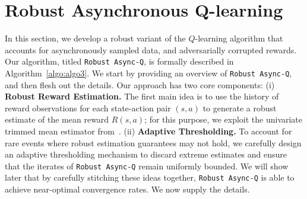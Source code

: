 \documentclass{article}
\begin{document}
\section{Robust Asynchronous Q-learning}
\label{sec:robustQ}
In this section, we develop a robust variant of the \(Q\)-learning algorithm that accounts for asynchronously sampled data, and adversarially corrupted rewards. Our algorithm, titled \textcolor{winered}{\texttt{Robust Async-Q}}, is formally described in Algorithm~\ref{algo:algo3}. We start by providing an overview of \texttt{Robust Async-Q}, and then flesh out the details. Our approach has two core components: (i) \textbf{Robust Reward Estimation.} The first main idea is to use the history of reward observations for each state-action pair $(s,a)$ to generate a robust estimate of the mean reward $R(s,a)$; for this purpose, we exploit the univariate trimmed mean estimator from~\citet{lugosi}. (ii) \textbf{Adaptive Thresholding.} To account for rare events where robust estimation guarantees may not hold, we carefully design an adaptive thresholding mechanism to discard extreme estimates and ensure that the iterates of \texttt{Robust Async-Q} remain uniformly bounded. We will show later that by carefully stitching these ideas together, \texttt{Robust Async-Q} is able to achieve near-optimal convergence rates. We now supply the details. 
\end{document}
